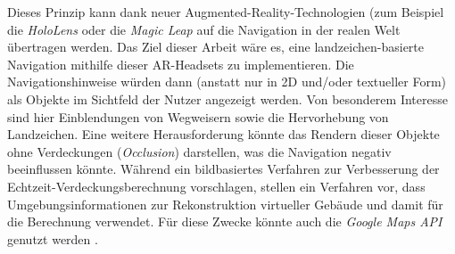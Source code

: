 \documentclass[a4paper]{scrartcl}
\begin{document}
Dieses Prinzip kann dank neuer Augmented-Reality-Technologien (zum Beispiel die \emph{HoloLens} oder die \emph{Magic Leap} auf die Navigation in der realen Welt übertragen werden.
Das Ziel dieser Arbeit wäre es, eine landzeichen-basierte Navigation mithilfe dieser AR-Headsets zu implementieren.
Die Navigationshinweise würden dann (anstatt nur in 2D und/oder textueller Form) als Objekte im Sichtfeld der Nutzer angezeigt werden.
Von besonderem Interesse sind hier Einblendungen von Wegweisern sowie die Hervorhebung von Landzeichen.
Eine weitere Herausforderung könnte das Rendern dieser Objekte ohne Verdeckungen (\emph{Occlusion}) darstellen, was die Navigation negativ beeinflussen könnte.
Während \textcite{Walton2017} ein bildbasiertes Verfahren zur Verbesserung der Echtzeit-Verdeckungsberechnung vorschlagen, stellen \textcite{Kasperi2017} ein Verfahren vor, dass Umgebungsinformationen zur Rekonstruktion virtueller Gebäude und damit für die Berechnung verwendet.
Für diese Zwecke könnte auch die \emph{Google Maps API} genutzt werden \parencite{Google2018}.

\end{document}
